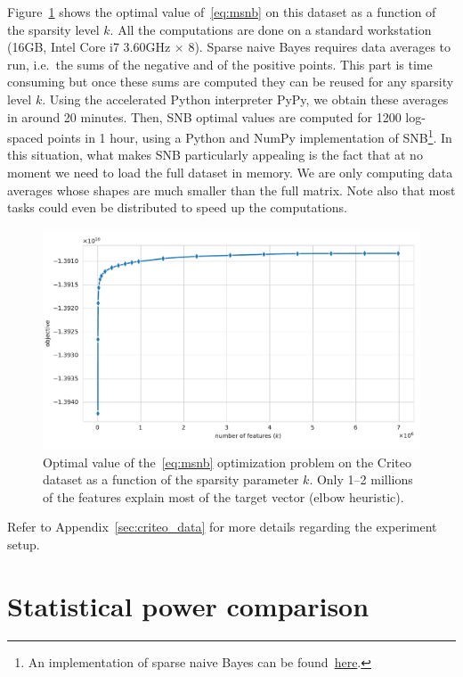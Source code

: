 Figure~\ref{fig:criteo_hash_elbow} shows the optimal value of~\ref{eq:msnb} on this dataset as a function
of the sparsity level $k$.
All the computations are done on a standard workstation (16GB, Intel Core i7 3.60GHz $\times$ 8).
Sparse naive Bayes requires data averages to run,
i.e.\ the sums of the negative and of the positive points.
This part is time consuming but once these sums are computed they can be reused for any sparsity level $k$.
Using the accelerated Python interpreter PyPy, we obtain these averages in around 20 minutes.
Then, SNB optimal values are computed for 1200 log-spaced points in 1 hour,
using a Python and NumPy implementation of SNB\footnote{
    An implementation of sparse naive Bayes can be found~\href{https://github.com/aspremon/NaiveFeatureSelection}{here}.
}.
In this situation, what makes SNB particularly appealing is the fact that at no moment we need to load the full dataset
in memory.
We are only computing data averages whose shapes are much smaller than the full matrix.
Note also that most tasks could even be distributed to speed up the computations.
\begin{figure}
    \centering
    \includegraphics[width=0.75\linewidth, height=0.4\linewidth]{figures/criteo_hash_elbow.pdf}
    \caption{
        Optimal value of the~\ref{eq:msnb} optimization problem on the Criteo dataset
        as a function of the sparsity parameter $k$.
        Only 1--2 millions of the features explain most of the target vector (elbow heuristic).
    }
    \label{fig:criteo_hash_elbow}
\end{figure}
Refer to Appendix~\ref{sec:criteo_data} for more details regarding the experiment setup.

\section{Statistical power comparison}\label{sec:power_comparison}

